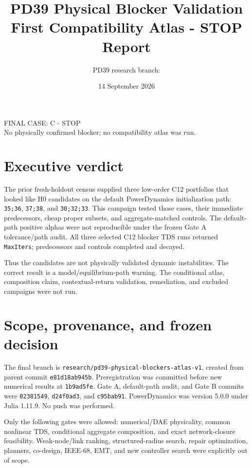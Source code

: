 \documentclass[10pt]{article}
\title{PD39 Physical Blocker Validation\\\large First Compatibility Atlas - STOP Report}
\author{PD39 research branch: \code{research/pd39-physical-blockers-atlas-v1}}
\date{14 September 2026}
\newcommand{\code}[1]{\texttt{#1}}
\begin{document}
\maketitle

\begin{center}
{\Large \textcolor{stopred}{FINAL CASE: C - STOP}}\\[4pt]
No physically confirmed blocker; no compatibility atlas was run.
\end{center}

\section*{Executive verdict}

The prior fresh-holdout census supplied three low-order C12 portfolios that
looked like H0 candidates on the default PowerDynamics initialization path:
\code{35;36}, \code{37;38}, and \code{30;32;33}. This campaign tested those
cases, their immediate predecessors, cheap proper subsets, and aggregate-matched
controls. The default-path positive alphas were not reproducible under the
frozen Gate A tolerance/path audit. All three selected C12 blocker TDS runs
returned \code{MaxIters}; predecessors and controls completed and decayed.

Thus the candidates are not physically validated dynamic instabilities. The
correct result is a model/equilibrium-path warning. The conditional atlas,
composition claim, contextual-return validation, remediation, and excluded
campaigns were not run.

\section{Scope, provenance, and frozen decision}

The final branch is \code{research/pd39-physical-blockers-atlas-v1}, created
from parent commit \code{e81d18ab945b}. Preregistration was committed before
new numerical results at \code{1b9ad5fe}. Gate A, default-path audit, and Gate
B commits were \code{02381549}, \code{d24f0ad3}, and \code{c95bab91}.
PowerDynamics was version 5.0.0 under Julia 1.11.9. No push was performed.

Only the following gates were allowed: numerical/DAE physicality, common
nonlinear TDS, conditional aggregate composition, and exact network-closure
feasibility. Weak-node/link ranking, structured-radius search, repair
optimization, planners, co-design, IEEE-68, EMT, and new controller search
were explicitly out of scope.
\end{document}
